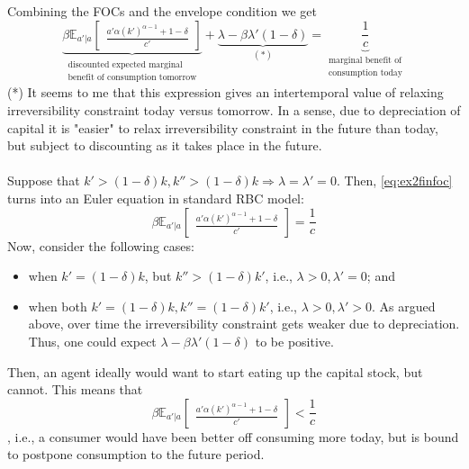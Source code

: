 \documentclass[]{article}
\begin{document}
Combining the FOCs and the envelope condition we get
\begin{equation}
	\underbrace{\beta\mathbb{E}_{a'|a}\begin{bmatrix}\frac{a'\alpha(k')^{\alpha - 1} + 1 - \delta}{c'}\end{bmatrix}}_{\substack{\text{discounted expected marginal} \\ \text{benefit of consumption tomorrow}}} + \underbrace{\lambda - \beta\lambda'(1 - \delta)}_{(*)} = \underbrace{\frac{1}{c}}_{\substack{\text{marginal benefit of}\\\text{consumption today}}}
	\label{eq:ex2finfoc}
\end{equation}
(*) It seems to me that this expression gives an intertemporal value of relaxing irreversibility constraint today versus tomorrow. In a sense, due to depreciation of capital it is "easier" to relax irreversibility constraint in the future than today, but subject to discounting as it takes place in the future.\\
\\
Suppose that $k' > (1 - \delta)k, k'' > (1 - \delta)k \Rightarrow \lambda = \lambda' = 0$. Then, \eqref{eq:ex2finfoc} turns into an Euler equation in standard RBC model:
\begin{equation}
	\beta\mathbb{E}_{a'|a}\begin{bmatrix}\frac{a'\alpha(k')^{\alpha - 1} + 1 - \delta}{c'}\end{bmatrix} = \frac{1}{c} \nonumber
\end{equation}
Now, consider the following cases:
\begin{itemize}
	\item when $k' = (1 - \delta)k$, but $k'' > (1 - \delta)k'$, i.e., $\lambda > 0, \lambda' = 0$; and
	\item  when both $k' = (1 - \delta)k, k'' = (1 - \delta)k'$, i.e., $\lambda > 0,  \lambda' > 0$. As argued above, over time the irreversibility constraint gets weaker due to depreciation. Thus, one could expect $\lambda - \beta\lambda'(1 - \delta)$ to be positive.
\end{itemize}
Then, an agent ideally would want to start eating up the capital stock, but cannot. This means that
\begin{equation}
	\beta\mathbb{E}_{a'|a}\begin{bmatrix}\frac{a'\alpha(k')^{\alpha - 1} + 1 - \delta}{c'}\end{bmatrix} < \frac{1}{c} \nonumber
\end{equation}
, i.e., a consumer would have been better off consuming more today, but is bound to postpone consumption to the future period.
\end{document}
